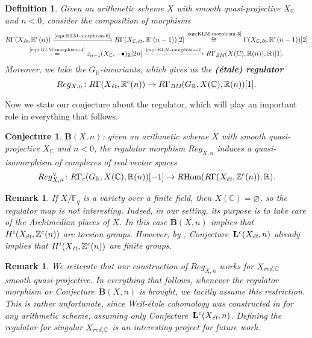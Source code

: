 \documentclass[10pt,a4paper,oneside]{article}
\DeclareMathOperator{\Hom}{Hom}
\newcommand{\CC}{\mathbb{C}}
\newcommand{\FF}{\mathbb{F}}
\newcommand{\RR}{\mathbb{R}}
\newcommand{\ZZ}{\mathbb{Z}}
\renewcommand{\emptyset}{\varnothing}
\newcommand{\BM}{\text{\it BM}}
\newcommand{\et}{\text{\it \'{e}t}}
\newcommand{\red}{\text{\it red}}
\newcommand{\RHom}{R\!\Hom}
\theoremstyle{myplain}
\theoremstyle{mydefinition}
\newtheorem{definition}[theorem]{Definition}
\newtheorem{conjecture}[theorem]{Conjecture}
\newtheorem{remark}[theorem]{Remark}
\numberwithin{equation}{section}
\begin{document}
\begin{definition}
  Given an arithmetic scheme $X$ with smooth quasi-projective $X_\CC$ and
  $n < 0$, consider the composition of morphisms
  \begin{multline*}
    R\Gamma (X_\et, \RR^c (n)) \xrightarrow{\text{\eqref{eqn:KLM-morphism-6}}}
    R\Gamma (X_{\CC,\et}, \RR^c (n-1)) [2] \stackrel{\text{\eqref{eqn:KLM-morphism-5}}}{\cong}
    \Gamma (X_{\CC,\et}, \RR^c (n-1)) [2] \\
    \stackrel{\text{\eqref{eqn:KLM-morphism-4}}}{=}
    z_{n-1} (X_\CC, -\bullet)_\RR [2n] \xrightarrow{\text{\eqref{eqn:KLM-morphism-3}}}
    R\Gamma_\BM (X (\CC), \RR (n)), \RR) [1].
  \end{multline*}
  Moreover, we take the $G_\RR$-invariants, which gives us the
  \textbf{(\'{e}tale) regulator}
  \[ Reg_{X,n}\colon R\Gamma (X_\et, \RR^c (n)) \to
    R\Gamma_\BM (G_\RR, X(\CC), \RR (n)) [1]. \]
\end{definition}

Now we state our conjecture about the regulator, which will play an important
role in everything that follows.

\begin{conjecture}
  $\mathbf{B} (X,n)$: given an arithmetic scheme $X$ with smooth
  quasi-projective $X_\CC$ and $n < 0$, the regulator morphism $Reg_{X,n}$
  induces a quasi-isomorphism of complexes of real vector spaces
  \[ Reg_{X,n}^\vee\colon R\Gamma_c (G_\RR, X (\CC), \RR (n)) [-1] \to
    \RHom (R\Gamma (X_\et, \ZZ^c (n)), \RR). \]
\end{conjecture}

\begin{remark}
  If $X/\FF_q$ is a variety over a finite field, then $X (\CC) = \emptyset$,
  so the regulator map is not interesting. Indeed, in our setting, its purpose
  is to take care of the Archimedian places of $X$. In this case
  $\mathbf{B} (X,n)$ implies that $H^i (X_\et, \ZZ^c (n))$ are torsion groups.
  However, by \cite[Proposition~4.2]{Beshenov-Weil-etale-1},
  Conjecture~$\mathbf{L}^c (X_\et, n)$ already implies that
  $H^i (X_\et, \ZZ^c (n))$ are finite groups.
\end{remark}

\begin{remark}
  \label{rmk:regulator-is-defined-for-XC-smooth-quasi-proj}
  We reiterate that our construction of $Reg_{X,n}$ works for $X_{\red,\CC}$
  smooth quasi-projective. In everything that follows, whenever the regulator
  morphism or Conjecture~$\mathbf{B} (X,n)$ is brought, we tacitly assume this
  restriction. This is rather unfortunate, since Weil-\'{e}tale cohomology was
  constructed in \cite{Beshenov-Weil-etale-1} for any arithmetic scheme,
  assuming only Conjecture~$\mathbf{L}^c (X_\et,n)$. Defining the regulator for
  singular $X_{\red,\CC}$ is an interesting project for future work.
\end{remark}
\end{document}

